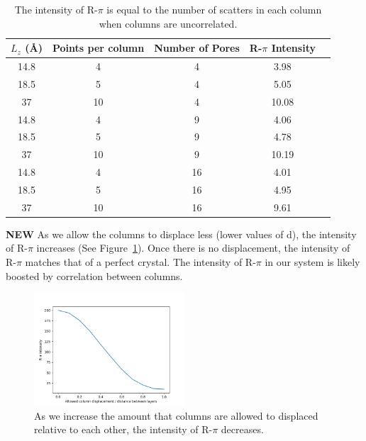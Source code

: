 \documentclass{article}
\begin{document}
  \begin{table}[!htb]
  \centering
  \begin{tabular}{c c c c c}
  \toprule
  $L_z$ (\AA) & Points per column & Number of Pores &  R-$\pi$ Intensity\\ 
  \midrule
  14.8        &      4            & 4               & 3.98              \\
  18.5        &      5            & 4               & 5.05              \\
  37          &      10           & 4               & 10.08             \\
  14.8        &      4            & 9               & 4.06              \\
  18.5        &      5            & 9               & 4.78              \\
  37          &      10           & 9               & 10.19             \\
  14.8        &      4            & 16              & 4.01              \\
  18.5        &      5            & 16              & 4.95              \\
  37          &      10           & 16              & 9.61              \\
  \bottomrule
  \end{tabular}
  \caption{The intensity of R-$\pi$ is equal to the number of scatters in 
   each column when columns are uncorrelated.}\label{table:randomly_displaced_columns}
  \end{table}

  \textbf{NEW} As we allow the columns to displace less (lower values of d),
  the intensity of R-$\pi$ increases (See Figure~\ref{fig:column_displacement}).
  Once there is no displacement, the intensity of R-$\pi$ matches that of a
  perfect crystal. The intensity of R-$\pi$ in our system is likely boosted by
  correlation between columns.

  \begin{figure}[!htb]
  \centering
  \includegraphics[width=0.5\textwidth]{column_displacement.png}
  \caption{As we increase the amount that columns are allowed to displaced relative
  to each other, the intensity of R-$\pi$ decreases.}\label{fig:column_displacement}
  \end{figure} 
\end{document}
